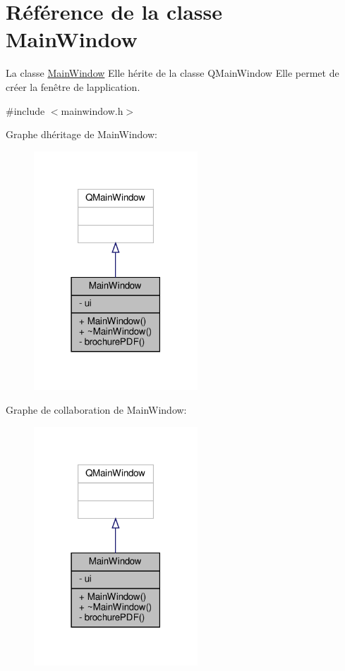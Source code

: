 \hypertarget{class_main_window}{}\section{Référence de la classe Main\+Window}
\label{class_main_window}


La classe \hyperlink{class_main_window}{Main\+Window} Elle hérite de la classe Q\+Main\+Window Elle permet de créer la fenêtre de l\textquotesingle{}application.  




{\ttfamily \#include $<$mainwindow.\+h$>$}



Graphe d\textquotesingle{}héritage de Main\+Window\+:\nopagebreak
\begin{figure}[H]
\begin{center}
\leavevmode
\includegraphics[width=174pt]{class_main_window__inherit__graph}
\end{center}
\end{figure}


Graphe de collaboration de Main\+Window\+:\nopagebreak
\begin{figure}[H]
\begin{center}
\leavevmode
\includegraphics[width=174pt]{class_main_window__coll__graph}
\end{center}
\end{figure}
